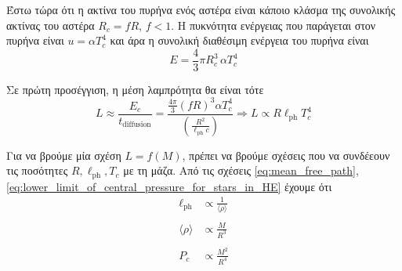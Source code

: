 Έστω τώρα ότι η ακτίνα του πυρήνα ενός αστέρα είναι κάποιο κλάσμα της συνολικής ακτίνας του αστέρα $R_c = fR, \,f<1$. Η πυκνότητα ενέργειας που παράγεται στον πυρήνα είναι $u=\alpha T_c^4$ και άρα η συνολική διαθέσιμη ενέργεια του πυρήνα είναι 
\begin{equation}
    E = \frac{4}{3} \pi R_c^3 \,\alpha T_c^4
\end{equation}

Σε πρώτη προσέγγιση, η μέση λαμπρότητα θα είναι τότε
\begin{equation}
    L \approx \frac{E_c}{t_{\text{diffusion}}} = \frac{\frac{4\pi}{3} (fR)^3 \alpha T_c^4}{\left( \frac{R^2}{\ell_{\text{ph}} c} \right)} \Rightarrow \boxed{ L \propto R \ell_{\text{ph}} T_c^4}
\end{equation}

Για να βρούμε μία σχέση $L = f(M)$, πρέπει να βρούμε σχέσεις που να συνδέεουν τις ποσότητες $R, \ell_{\text{ph}}, T_c$ με τη μάζα. Από τις σχέσεις \eqref{eq:mean_free_path}, \eqref{eq:lower_limit_of_central_pressure_for_stars_in_HE} έχουμε ότι
\begin{align*}
    \ell_{\text{ph}} &\propto \frac{1}{\langle \rho \rangle} \\\\
    \langle \rho \rangle &\propto \frac{M}{R^3} \\\\
    P_c &\propto \frac{M^2}{R^4}
\end{align*}

